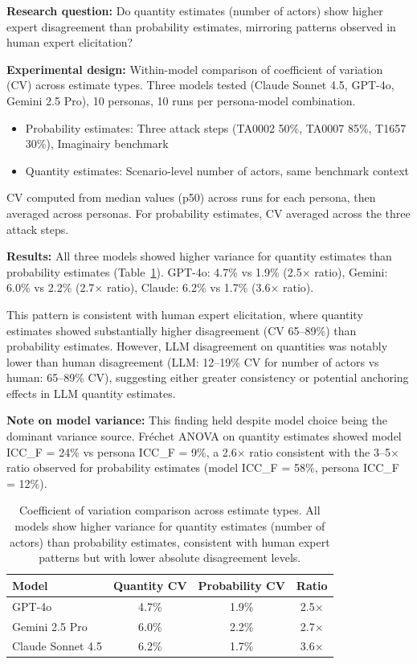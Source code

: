 \documentclass[midterm]{sparreport}
\begin{document}
\textbf{Research question:} Do quantity estimates (number of actors) show higher expert disagreement than probability estimates, mirroring patterns observed in human expert elicitation?

\textbf{Experimental design:} Within-model comparison of coefficient of variation (CV) across estimate types. Three models tested (Claude Sonnet 4.5, GPT-4o, Gemini 2.5 Pro), 10 personas, 10 runs per persona-model combination.
\begin{itemize}
\item Probability estimates: Three attack steps (TA0002 50\%, TA0007 85\%, T1657 30\%), Imaginairy benchmark
\item Quantity estimates: Scenario-level number of actors, same benchmark context
\end{itemize}

CV computed from median values (p50) across runs for each persona, then averaged across personas. For probability estimates, CV averaged across the three attack steps.

\textbf{Results:} All three models showed higher variance for quantity estimates than probability estimates (Table~\ref{tab:quantity_variance}). GPT-4o: 4.7\% vs 1.9\% (2.5$\times$ ratio), Gemini: 6.0\% vs 2.2\% (2.7$\times$ ratio), Claude: 6.2\% vs 1.7\% (3.6$\times$ ratio).

This pattern is consistent with human expert elicitation, where quantity estimates showed substantially higher disagreement (CV 65--89\%) than probability estimates. However, LLM disagreement on quantities was notably lower than human disagreement (LLM: 12--19\% CV for number of actors vs human: 65--89\% CV), suggesting either greater consistency or potential anchoring effects in LLM quantity estimates.

\textbf{Note on model variance:} This finding held despite model choice being the dominant variance source. Fréchet ANOVA on quantity estimates showed model ICC\_F = 24\% vs persona ICC\_F = 9\%, a 2.6$\times$ ratio consistent with the 3--5$\times$ ratio observed for probability estimates (model ICC\_F = 58\%, persona ICC\_F = 12\%).

\begin{table}[htbp]
\centering
\caption{Coefficient of variation comparison across estimate types. All models show higher variance for quantity estimates (number of actors) than probability estimates, consistent with human expert patterns but with lower absolute disagreement levels.}
\label{tab:quantity_variance}
\begin{tabular}{lccc}
\toprule
\textbf{Model} & \textbf{Quantity CV} & \textbf{Probability CV} & \textbf{Ratio} \\
\midrule
GPT-4o & 4.7\% & 1.9\% & 2.5$\times$ \\
Gemini 2.5 Pro & 6.0\% & 2.2\% & 2.7$\times$ \\
Claude Sonnet 4.5 & 6.2\% & 1.7\% & 3.6$\times$ \\
\bottomrule
\end{tabular}
\end{table}
\end{document}

